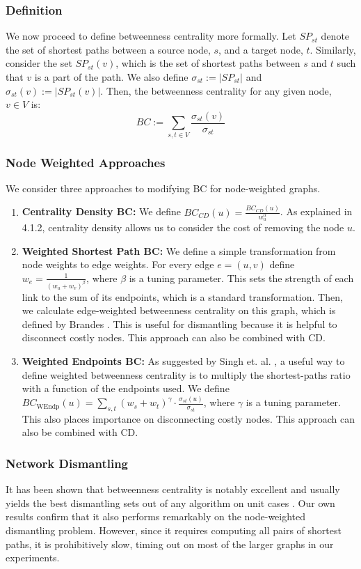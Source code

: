 \documentclass{article}
\begin{document}
\subsubsection{Definition}
We now proceed to define betweenness centrality more formally.
Let $SP_{st}$ denote the set of shortest paths between a source node, $s$, and a target node, $t$. 
Similarly, consider the set $SP_{st}(v)$, which is the set of shortest paths between $s$ and $t$ such that $v$ is a part of the path.
We also define $\sigma_{st} := |SP_{st}|$ and $\sigma_{st}(v) := |SP_{st}(v)|$.
Then, the betweenness centrality for any given node, $v \in V$ is:
$$BC := \sum\limits_{s, t \in V}\frac{\sigma_{st}(v)}{\sigma_{st}}$$

\subsubsection{Node Weighted Approaches}
We consider three approaches to modifying BC for node-weighted graphs.
\begin{enumerate}[label=\textbf{\Alph*}.]
\item \textbf{Centrality Density BC:} We define $BC_{CD}(u) = \frac{BC_{CD}(u)}{w_u^\alpha}$. As explained in 4.1.2, centrality density allows us to consider the cost of removing the node $u$.
\item \textbf{Weighted Shortest Path BC:} We define a simple transformation from node weights to edge weights. For every edge $e = (u, v)$ define $w_e = \frac{1}{(w_u + w_v)^\beta}$, where $\beta$ is a tuning parameter. This sets the strength of each link to the sum of its endpoints, which is a standard transformation. Then, we calculate edge-weighted betweenness centrality on this graph, which is defined by Brandes \cite{BRANDES2008136}. This is useful for dismantling because it is helpful to disconnect costly nodes. This approach can also be combined with CD.
\item \textbf{Weighted Endpoints BC:} As suggested by Singh et. al. \cite{singh}, a useful way to define weighted betweenness centrality is to multiply the shortest-paths ratio with a function of the endpoints used. We define $BC_{\text{WEndp}}(u) = \sum_{s,t}(w_s + w_t)^\gamma \cdot {\frac{\sigma_{st}(u)}{\sigma_{st}}}$, where $\gamma$ is a tuning parameter. This also places importance on disconnecting costly nodes. This approach can also be combined with CD.
\end{enumerate}

\subsubsection{Network Dismantling}
It has been shown that betweenness centrality is notably excellent and usually yields the best dismantling sets out of any algorithm on unit cases \cite{analysis}. 
Our own results confirm that it also performs remarkably on the node-weighted dismantling problem. However, since it requires computing all pairs of shortest paths, it is prohibitively slow, timing out on most of the larger graphs in our experiments.
\end{document}
